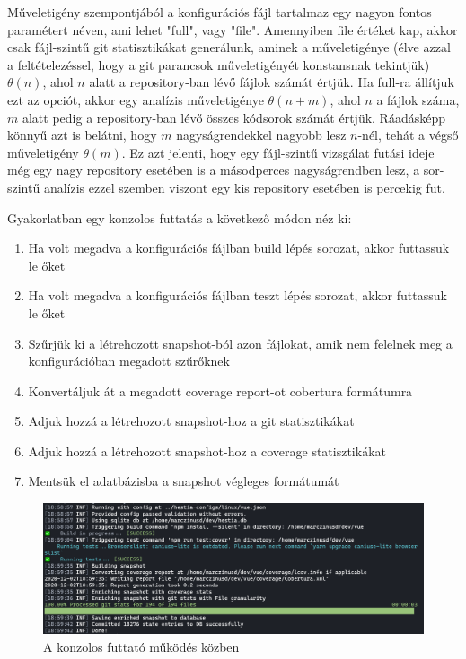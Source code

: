 Műveletigény szempontjából a konfigurációs fájl tartalmaz egy nagyon fontos paramétert  néven, ami lehet "full", vagy "file". Amennyiben file értéket kap, akkor csak fájl-szintű git statisztikákat generálunk, aminek a műveletigénye (élve azzal a feltételezéssel, hogy a git parancsok műveletigényét konstansnak tekintjük) \( \theta(n) \), ahol \(n\) alatt a repository-ban lévő fájlok számát értjük. Ha full-ra állítjuk ezt az opciót, akkor egy analízis műveletigénye \( \theta(n + m) \), ahol \(n\) a fájlok száma, \(m\) alatt pedig a repository-ban lévő összes kódsorok számát értjük. Ráadásképp könnyű azt is belátni, hogy \(m\) nagyságrendekkel nagyobb lesz \(n\)-nél, tehát a végső műveletigény \( \theta(m) \). Ez azt jelenti, hogy egy fájl-szintű vizsgálat futási ideje még egy nagy repository esetében is a másodperces nagyságrendben lesz, a sor-szintű analízis ezzel szemben viszont egy kis repository esetében is percekig fut.

Gyakorlatban egy konzolos futtatás a következő módon néz ki:
\begin{enumerate}
    \item Ha volt megadva a konfigurációs fájlban build lépés sorozat, akkor futtassuk le őket
    \item Ha volt megadva a konfigurációs fájlban teszt lépés sorozat, akkor futtassuk le őket
    \item Szűrjük ki a létrehozott snapshot-ból azon fájlokat, amik nem felelnek meg a konfigurációban megadott szűrőknek
    \item Konvertáljuk át a megadott coverage report-ot cobertura formátumra
    \item Adjuk hozzá a létrehozott snapshot-hoz a git statisztikákat
    \item Adjuk hozzá a létrehozott snapshot-hoz a coverage statisztikákat
    \item Mentsük el adatbázisba a snapshot végleges formátumát
\end{enumerate}

\begin{figure}[H]
    \centering
    \includegraphics[width=1\textwidth]{images/hestia-console-run-vue.png}
    \caption{A konzolos futtató működés közben}
    \label{fig:console-runner-example}
\end{figure}

